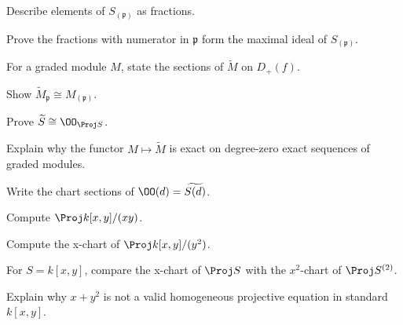 \begin{exercise}\label{exr:vi35-12}
Describe elements of \(S_{(\mathfrak p)}\) as fractions.
\end{exercise}

\begin{exercise}[Locality]\label{exr:vi35-13}
Prove the fractions with numerator in \(\mathfrak p\) form the maximal ideal of \(S_{(\mathfrak p)}\).
\end{exercise}

\begin{exercise}\label{exr:vi35-14}
For a graded module \(M\), state the sections of \(\widetilde M\) on \(D_+(f)\).
\end{exercise}

\begin{exercise}\label{exr:vi35-15}
Show \(\widetilde M_{\mathfrak p}\cong M_{(\mathfrak p)}\).
\end{exercise}

\begin{exercise}\label{exr:vi35-16}
Prove \(\widetilde S\cong\OO_{\Proj S}\).
\end{exercise}

\begin{exercise}[Exactness]\label{exr:vi35-17}
Explain why the functor \(M\mapsto\widetilde M\) is exact on degree-zero exact sequences of graded modules.
\end{exercise}

\begin{exercise}\label{exr:vi35-18}
Write the chart sections of \(\OO(d)=\widetilde{S(d)}\).
\end{exercise}

\begin{exercise}\label{exr:vi35-19}
Compute \(\Proj k[x,y]/(xy)\).
\end{exercise}

\begin{exercise}\label{exr:vi35-20}
Compute the x-chart of \(\Proj k[x,y]/(y^2)\).
\end{exercise}

\begin{exercise}\label{exr:vi35-21}
For \(S=k[x,y]\), compare the x-chart of \(\Proj S\) with the \(x^2\)-chart of \(\Proj S^{(2)}\).
\end{exercise}

\begin{exercise}\label{exr:vi35-22}
Explain why \(x+y^2\) is not a valid homogeneous projective equation in standard \(k[x,y]\).
\end{exercise}

